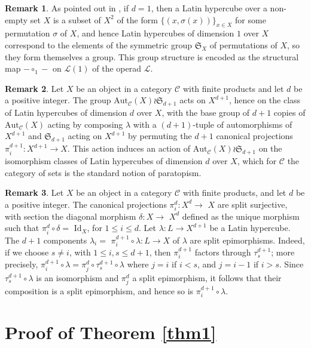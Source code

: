 \documentclass{amsart} %
\theoremstyle{plain}\newtheorem{Theorem}{Theorem}[section]
\theoremstyle{plain}\newtheorem{Conjecture}[Theorem]{Conjecture}
\theoremstyle{plain}\newtheorem{Corollary}[Theorem]{Corollary}
\theoremstyle{plain}\newtheorem{Lemma}[Theorem]{Lemma}
\theoremstyle{plain}\newtheorem{Proposition}[Theorem]{Proposition}
\theoremstyle{definition}\newtheorem{Definition}[Theorem]{Definition}
\theoremstyle{definition}\newtheorem{Example}[Theorem]{Example}
\theoremstyle{definition}\newtheorem{Examples}[Theorem]{Examples}
\theoremstyle{definition}\newtheorem{Remark}[Theorem]{Remark}
\theoremstyle{definition}\newtheorem{Remarks}[Theorem]{Remarks}
\theoremstyle{plain}\newtheorem{Statement}[Theorem]{}
\def\CC{{\mathcal{C}}}    \def\OP{{\mathcal{O}P}}
\def\CL{{\mathcal{L}}}  \def\bCL{{\mathbf{L}}}
\def\Aut{\mathrm{Aut}}   \def\bAut{\mathbf{Aut}}        \def\tenk{\otimes_k}
\def\Id{\mathrm{Id}}             \def\tenA{\otimes_A}
\def\sym{\mathfrak{S}} %
\begin{document}
\begin{Remark}
As  pointed out in \cite{McKayWan},  if $d=1$, then a Latin hypercube over  a
non-empty set $X$  is a subset of $X^2$ of the form $\{(x,\sigma(x))\}_{x\in X}$ 
for some permutation  $\sigma$ of $X$, and hence Latin hypercubes of dimension 
$1$ over $X$ correspond  to the elements of the symmetric group $\sym_X$ of 
permutations of $X$, so they form themselves a group. This group structure is 
encoded as the structural map  $-\circ_1 -$ on $\CL(1)$ of the operad $\CL$. 
\end{Remark}

\begin{Remark} \label{AutLatinRemark}
Let $X$ be an object in a category $\CC$ with finite products and let $d$ be a 
positive integer.  The group $\Aut_\CC(X)\wr \sym_{d+1}$ acts on $X^{d+1}$, hence 
on the class of Latin hypercubes of  dimension $d$ over $X$, with the base group of 
$d+1$ copies of $\Aut_\CC(X)$ acting by composing $\lambda$ with a $(d+1)$-tuple 
of automorphisms of $X^{d+1}$ and $\sym_{d+1}$ acting on $X^{d+1}$ by permuting 
the $d+1$ canonical  projections  $\pi^{d+1}_i : X^{d+1}\to X$. This action induces an 
action of $\Aut_\CC(X)\wr \sym_{d+1}$ on the isomorphism classes of Latin 
hypercubes of dimension $d$ over $X$, which for $\CC$ the category of sets is
the standard notion of paratopism.
\end{Remark}

\begin{Remark}
Let $X$ be an object in a category $\CC$ with finite products, and let $d$ be a
positive integer. The canonical projections $\pi^{d}_i : X^{d}\to$ $X$ are
split surjective, with section the diagonal morphism $\delta : X\to$ $X^{d}$
defined as the unique morphism such that $\pi^{d}_i\circ\delta=$ $\Id_X$, for
$1\leq i\leq d$.  Let $\lambda : L\to X^{d+1}$ be a Latin hypercube.
The $d+1$ components $\lambda_i=$ $\pi^{d+1}_i\circ\lambda : L\to X$ 
of $\lambda$  are split  epimorphisms. 
Indeed, if we choose $s\neq i$, with $1\leq i,s\leq d+1$,
then $\pi^{d+1}_i$ factors through $\tau^{d+1}_s$; more precisely, 
$\pi^{d+1}_i\circ\lambda = \pi^{d}_j\circ \tau^{d+1}_s\circ \lambda$
where $j=i$ if $i<s$, and $j=i-1$ if $i>s$. Since $\tau^{d+1}_s\circ\lambda$
is an isomorphism and $\pi^d_j$ a split epimorphism, it follows that their
composition is a split epimorphism, and hence so is $\pi^{d+1}_i\circ\lambda$.
\end{Remark} 


\section{Proof of Theorem \ref{thm1}} \label{thm1proofSection}  
\end{document}

